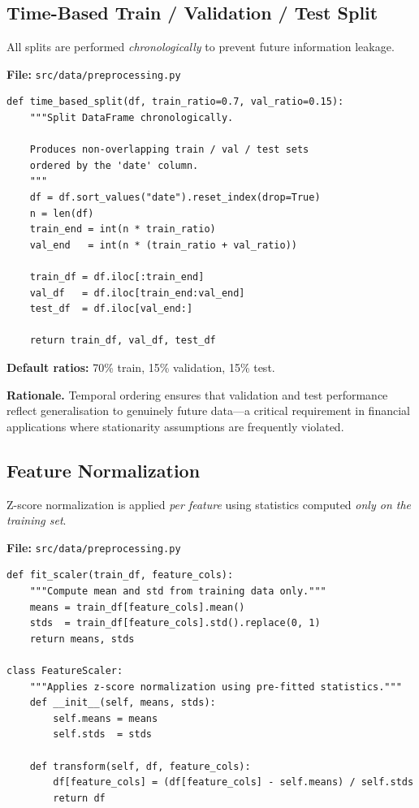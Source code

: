 \documentclass[12pt, a4paper]{article}
\begin{document}
\subsection{Time-Based Train / Validation / Test Split}
\label{sec:splits}

All splits are performed \emph{chronologically} to prevent future information leakage.

\noindent\textbf{File:} \texttt{src/data/preprocessing.py}

\begin{lstlisting}[caption={Time-based data splitting}]
def time_based_split(df, train_ratio=0.7, val_ratio=0.15):
    """Split DataFrame chronologically.
    
    Produces non-overlapping train / val / test sets
    ordered by the 'date' column.
    """
    df = df.sort_values("date").reset_index(drop=True)
    n = len(df)
    train_end = int(n * train_ratio)
    val_end   = int(n * (train_ratio + val_ratio))
    
    train_df = df.iloc[:train_end]
    val_df   = df.iloc[train_end:val_end]
    test_df  = df.iloc[val_end:]
    
    return train_df, val_df, test_df
\end{lstlisting}

\noindent\textbf{Default ratios:} 70\% train, 15\% validation, 15\% test.

\textbf{Rationale.}  Temporal ordering ensures that validation and test performance reflect generalisation to genuinely future data---a critical requirement in financial applications where stationarity assumptions are frequently violated.

\subsection{Feature Normalization}
\label{sec:normalization}

Z-score normalization is applied \emph{per feature} using statistics computed \emph{only on the training set}.

\noindent\textbf{File:} \texttt{src/data/preprocessing.py}

\begin{lstlisting}[caption={Z-score normalization}]
def fit_scaler(train_df, feature_cols):
    """Compute mean and std from training data only."""
    means = train_df[feature_cols].mean()
    stds  = train_df[feature_cols].std().replace(0, 1)
    return means, stds

class FeatureScaler:
    """Applies z-score normalization using pre-fitted statistics."""
    def __init__(self, means, stds):
        self.means = means
        self.stds  = stds
    
    def transform(self, df, feature_cols):
        df[feature_cols] = (df[feature_cols] - self.means) / self.stds
        return df
\end{lstlisting}
\end{document}
